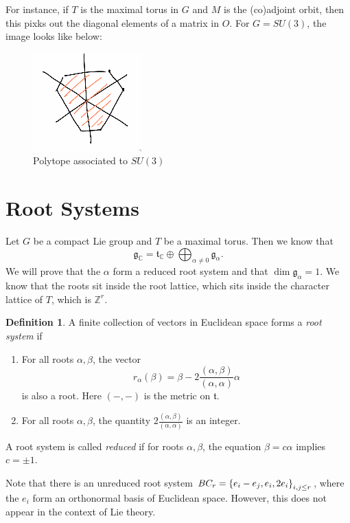 \documentclass[leqno, openany]{memoir}
\theoremstyle{definition}
\newtheorem{defn}[thm]{Definition}
\theoremstyle{remark}
\theoremstyle{plain}
\theoremstyle{definition}
\theoremstyle{remark}
\newcommand{\C}{\mathbb{C}}
\newcommand{\Z}{\mathbb{Z}}
\newcommand{\mf}[1]{\mathfrak{#1}}
\begin{document}
For instance, if $T$ is the maximal torus in $G$ and $M$ is the (co)adjoint orbit, then this pixks out the diagonal elements of a matrix in $O$. For $G = SU(3)$, the image looks like below:
\begin{figure}[H]
    \centering
    \includegraphics[scale=1]{su3polytope.png}
    \caption{Polytope associated to $SU(3)$}%
    \label{fig:su3polytope}
\end{figure}

\section{Root Systems}%
\label{sec:root_systems}

Let $G$ be a compact Lie group and $T$ be a maximal torus. Then we know that
\[ \mf{g}_{\C} = \mf{t}_{\C} \oplus \bigoplus_{\alpha \neq 0} \mf{g}_{\alpha}. \]
We will prove that the $\alpha$ form a reduced root system and that $\dim \mf{g}_{\alpha} = 1$. We know that the roots sit inside the root lattice, which sits inside the character lattice of $T$, which is $\Z^r$.

\begin{defn}
    A finite collection of vectors in Euclidean space forms a \textit{root system} if
    \begin{enumerate}
        \item For all roots $\alpha, \beta$, the vector 
            \[ r_{\alpha}(\beta) = \beta - 2 \frac{(\alpha, \beta)}{(\alpha, \alpha)} \alpha \]
            is also a root. Here $(-,-)$ is the metric on $\mf{t}$.
        \item For all roots $\alpha, \beta$, the quantity $2 \frac{(\alpha, \beta)}{(\alpha, \alpha)}$ is an integer.
    \end{enumerate}
    A root system is called \textit{reduced} if for roots $\alpha, \beta$, the equation $\beta = c \alpha$ implies $c = \pm 1$.
\end{defn}

Note that there is an unreduced root system $BC_r = \qty{e_i - e_j, e_i, 2e_i}_{i,j \leq r}$, where the $e_i$ form an orthonormal basis of Euclidean space. However, this does not appear in the context of Lie theory.
\end{document}
